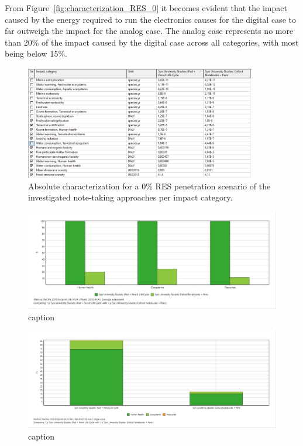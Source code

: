 From Figure~\ref{fig:characterization_RES_0} it becomes evident that the impact caused by the energy required to run the electronics causes for the digital case to far outweigh the impact for the analog case. The analog case represents no more than 20\% of the impact caused by the digital case across all categories, with most being below 15\%.

\begin{figure}[H]
    \centering
    \includegraphics[width=0.9\textwidth]{images/RES_0/Characterization_Table_RES_0.PNG}
    \caption{Absolute characterization for a 0\% RES penetration scenario of the investigated note-taking approaches per impact category.}\label{fig:characterization_table_RES_0}
\end{figure}

\begin{figure}[H]
    \centering
    \includegraphics[width=\textwidth]{images/RES_0/Damage_Assessment_RES_0.JPG}
    \caption{caption}\label{fig:damage_assessment_RES_0}
\end{figure}

\begin{figure}[H]
    \centering
    \includegraphics[width=\textwidth]{images/RES_0/Single_Score_RES_0.JPG}
    \caption{caption}\label{fig:single_score_RES0}
\end{figure}

